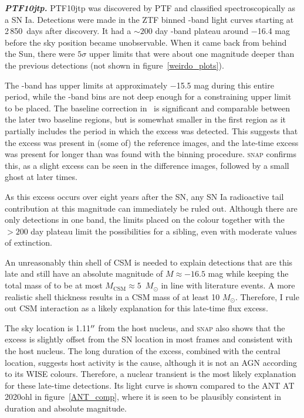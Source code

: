 \documentclass[a4paper,oneside,12pt, class=Latex/Classes/PhDthesisPSnPDF, crop=false]{standalone}
\begin{document}
\textit{\textbf{PTF10jtp.}}
PTF10jtp was discovered by PTF and classified spectroscopically as a SN Ia. Detections were made in the ZTF binned \ztfr-band light curves starting at 2\,850~days after discovery. It had a $\sim 200$ day \ztfr-band plateau around $-$16.4 mag before the sky position became unobservable. When it came back from behind the Sun, there were $5\sigma$ upper limits that were about one magnitude deeper than the previous detections (not shown in figure~\ref{weirdo_plots}).

The \ztfg-band has upper limits at approximately $-$15.5 mag during this entire period, while the \ztfi-band bins are not deep enough for a constraining upper limit to be placed. The baseline correction in \ztfr\ is significant and comparable between the later two baseline regions, but is somewhat smaller in the first region as it partially includes the period in which the excess was detected. This suggests that the excess was present in (some of) the reference images, and the late-time excess was present for longer than was found with the binning procedure. \textsc{snap} confirms this, as a slight excess can be seen in the difference images, followed by a small ghost at later times.

As this excess occurs over eight years after the SN, any SN Ia radioactive tail contribution at this magnitude can immediately be ruled out. Although there are only detections in one band, the limits placed on the colour together with the $>200$ day plateau limit the possibilities for a sibling, even with moderate values of extinction.

An unreasonably thin shell of CSM is needed to explain detections that are this late and still have an absolute magnitude of $M \approx -16.5$ mag while keeping the total mass of to be at most $M_\text{CSM} \approx 5$~$M_\odot$ in line with literature events. A more realistic shell thickness results in a CSM mass of at least 10 $M_\odot$. Therefore, I rule out CSM interaction as a likely explanation for this late-time flux excess.

The sky location is 1.11$^{\prime\prime}$ from the host nucleus, and \textsc{snap} also shows that the excess is slightly offset from the SN location in most frames and consistent with the host nucleus. The long duration of the excess, combined with the central location, suggests host activity is the cause, although it is not an AGN according to its WISE colours. Therefore, a nuclear transient is the most likely explanation for these late-time detections. Its light curve is shown compared to the ANT AT 2020ohl in figure~\ref{ANT_comp}, where it is seen to be plausibly consistent in duration and absolute magnitude.\\
\end{document}
